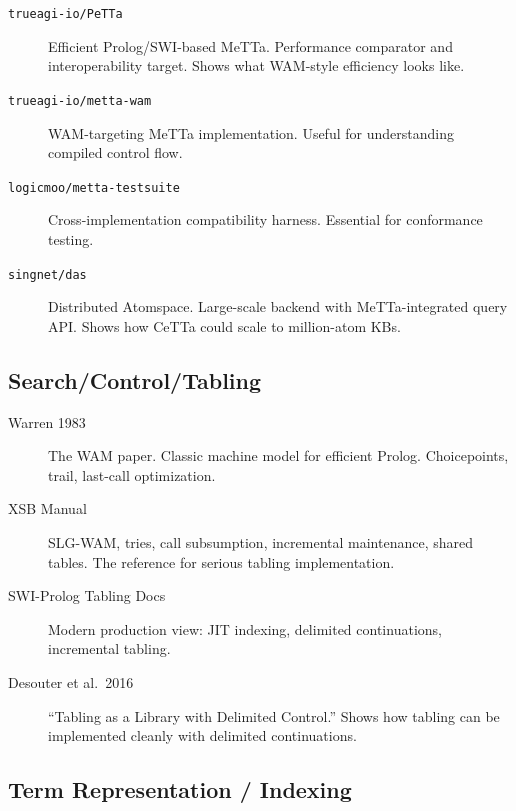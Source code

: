 \documentclass[11pt]{article}
\newcommand{\code}[1]{\texttt{#1}}
\newcommand{\CeTTa}{\textup{CeTTa}}
\newcommand{\WAM}{\textup{WAM}}
\newcommand{\XSB}{\textup{XSB}}
\begin{document}
\begin{description}
\item[\code{trueagi-io/PeTTa}]
  Efficient Prolog/SWI-based MeTTa.  Performance comparator and
  interoperability target.  Shows what \WAM{}-style efficiency looks like.

\item[\code{trueagi-io/metta-wam}]
  WAM-targeting MeTTa implementation.  Useful for understanding
  compiled control flow.

\item[\code{logicmoo/metta-testsuite}]
  Cross-implementation compatibility harness.  Essential for
  conformance testing.

\item[\code{singnet/das}]
  Distributed Atomspace.  Large-scale backend with MeTTa-integrated
  query API.  Shows how \CeTTa{} could scale to million-atom KBs.
\end{description}

\subsection{Search/Control/Tabling}

\begin{description}
\item[Warren 1983]
  The WAM paper.  Classic machine model for efficient Prolog.
  Choicepoints, trail, last-call optimization.

\item[\XSB{} Manual]
  SLG-WAM, tries, call subsumption, incremental maintenance, shared
  tables.  The reference for serious tabling implementation.

\item[SWI-Prolog Tabling Docs]
  Modern production view: JIT indexing, delimited continuations,
  incremental tabling.

\item[Desouter et al.\ 2016]
  ``Tabling as a Library with Delimited Control.''  Shows how tabling
  can be implemented cleanly with delimited continuations.
\end{description}

\subsection{Term Representation / Indexing}
\end{document}
